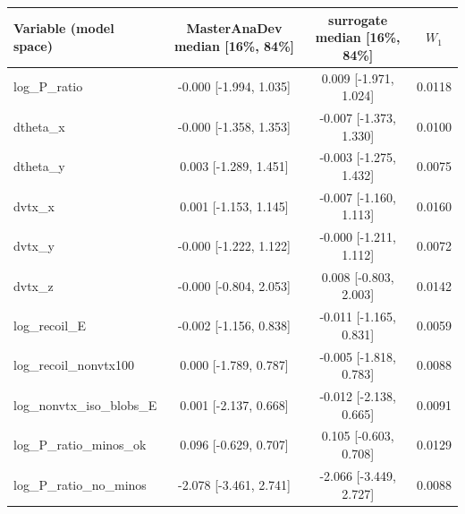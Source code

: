 \begin{tabular}{lccc}
\toprule
Variable (model space) & MasterAnaDev median [16\%, 84\%] & surrogate median [16\%, 84\%] & $W_1$ \\
\midrule
log\_P\_ratio & -0.000 [-1.994, 1.035] & 0.009 [-1.971, 1.024] & 0.0118 \\
dtheta\_x & -0.000 [-1.358, 1.353] & -0.007 [-1.373, 1.330] & 0.0100 \\
dtheta\_y & 0.003 [-1.289, 1.451] & -0.003 [-1.275, 1.432] & 0.0075 \\
dvtx\_x & 0.001 [-1.153, 1.145] & -0.007 [-1.160, 1.113] & 0.0160 \\
dvtx\_y & -0.000 [-1.222, 1.122] & -0.000 [-1.211, 1.112] & 0.0072 \\
dvtx\_z & -0.000 [-0.804, 2.053] & 0.008 [-0.803, 2.003] & 0.0142 \\
log\_recoil\_E & -0.002 [-1.156, 0.838] & -0.011 [-1.165, 0.831] & 0.0059 \\
log\_recoil\_nonvtx100 & 0.000 [-1.789, 0.787] & -0.005 [-1.818, 0.783] & 0.0088 \\
log\_nonvtx\_iso\_blobs\_E & 0.001 [-2.137, 0.668] & -0.012 [-2.138, 0.665] & 0.0091 \\
log\_P\_ratio\_minos\_ok & 0.096 [-0.629, 0.707] & 0.105 [-0.603, 0.708] & 0.0129 \\
log\_P\_ratio\_no\_minos & -2.078 [-3.461, 2.741] & -2.066 [-3.449, 2.727] & 0.0088 \\
\bottomrule
\end{tabular}
